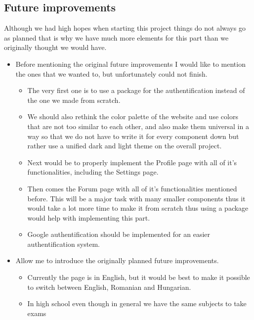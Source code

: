 \documentclass[12pt,a4paper]{article}
\begin{document}
\begin{spacing}{1.5}
    \subsection{Future improvements}
    Although we had high hopes when starting this project things do not always go
    as planned that is why we have much more elements for this part than we
    originally thought we would have.
    \begin{itemize}
        \item  Before mentioning the original future improvements I would like to mention the
              ones that we wanted to, but unfortunately could not finish.
              \begin{itemize}
                  \item  The very first one is to use a package for the authentification instead of the
                        one we made from scratch.
                  \item  We should also rethink the color palette of the website and use colors that are
                        not too similar to each other, and also make them universal in a way so that we
                        do not have to write it for every component down but rather use a unified dark
                        and light theme on the overall project. \item  Next would be to properly implement the Profile page with all of it's
                        functionalities, including the Settings page.
                  \item  Then comes the Forum page with all of it's functionalities mentioned before.
                        This will be a major task with many smaller components thus it would take a lot
                        more time to make it from scratch thus using a package would help with
                        implementing this part.
                  \item Google authentification should be implemented for an easier authentification
                        system.
              \end{itemize}
        \item Allow me to introduce the originally planned future improvements.
              \begin{itemize}
                  \item Currently the page is in English, but it would be best to make it possible to
                        switch between English, Romanian and Hungarian.
                  \item In high school even though in general we have the same subjects to take exams

\end{itemize}
\end{itemize}
\end{spacing}
\end{document}
